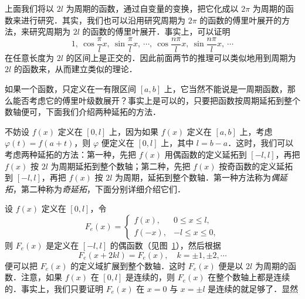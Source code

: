 上面我们将以 $2l$ 为周期的函数，通过自变量的变换，把它化成以 $2\pi$ 为周期的函数来进行研究．其实，我们也可以沿用研究周期为 $2\pi$ 的函数的傅里叶展开的方法，来研究周期为 $2l$ 的函数的傅里叶展开．事实上，可以证明
\[
1,\ \cos\frac{\pi}{l}x,\ \sin\frac{\pi}{l}x,\ \cdots,\ \cos\frac{n\pi}{l}x,\ \sin\frac{n\pi}{l}x,\ \cdots
\]
在任意长度为 $2l$ 的区间上是正交的．因此前面两节的推理可以类似地用到周期为 $2l$ 的函数来，从而建立类似的理论．

如果一个函数，只定义在一有限区间 $[a,b]$ 上，它当然不能说是一周期函数，那么能否考虑它的傅里叶级数展开？事实上是可以的，只要把函数按周期延拓到整个数轴便可，下面我们介绍两种延拓的方法．

不妨设 $f(x)$ 定义在 $[0,l]$ 上，因为如果 $f(x)$ 定义在 $[a,b]$ 上，考虑 $\varphi(t)=f(a+t)$，则 $\varphi$ 便定义在 $[0,l]$ 上，其中 $l=b-a$．这时，我们可以考虑两种延拓的方法：第一种，先把 $f(x)$ 用偶函数的定义延拓到 $[-l,l]$，再把 $f(x)$ 按 $2l$ 为周期延拓到整个数轴；第二种，先把 $f(x)$ 按奇函数的定义延拓到 $[-l,l]$，再把 $f(x)$ 按 $2l$ 为周期，延拓到整个数轴．第一种方法称为\emph{偶延拓}，第二种称为\emph{奇延拓}，下面分别详细介绍它们．

设 $f(x)$ 定义在 $[0,l]$，令
\[
F_{e}(x)=\begin{cases}
f(x), & 0\leqslant x\leqslant l,\\
f(-x), & -l\leqslant x\leqslant 0,
\end{cases}
\]
则 $F_{e}(x)$ 是定义在 $[-l,l]$ 的偶函数（见图~\ref{fig:14-11}），然后根据
\[
F_{e}(x+2kl)=F_{e}(x),\quad k=\pm 1,\pm 2,\cdots
\]
便可以把 $F_{e}(x)$ 的定义域扩展到整个数轴．这时 $F_{e}(x)$ 便是以 $2l$ 为周期的函数．注意，如果 $f(x)$ 在 $[0,l]$ 是连续的，则 $F_{e}(x)$ 在整个数轴上都是连续的．事实上，我们只要证明 $F_{e}(x)$ 在 $x=0$ 与 $x=\pm l$ 是连续的就足够了．显然

\begin{figure}[htbp]
\centering
{}\caption{\relax}\label{fig:14-11}
\end{figure}


